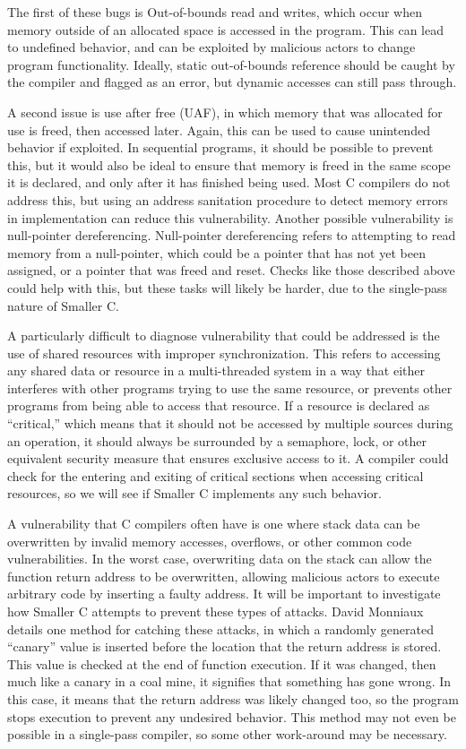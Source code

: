 \documentclass[sigconf, anonymous]{acmart}
\begin{document}
The first of these bugs is Out-of-bounds read and writes, which occur when memory outside of an allocated space is accessed in the program. This can lead to undefined behavior, and can be exploited by malicious actors to change program functionality. Ideally, static out-of-bounds reference should be caught by the compiler and flagged as an error, but dynamic accesses can still pass through.

A second issue is use after free (UAF), in which memory that was allocated for use is freed, then accessed later. Again, this can be used to cause unintended behavior if exploited. In sequential programs, it should be possible to prevent this, but it would also be ideal to ensure that memory is freed in the same scope it is declared, and only after it has finished being used. Most C compilers do not address this, but using an address sanitation procedure to detect memory errors in implementation can reduce this vulnerability. Another possible vulnerability is null-pointer dereferencing. Null-pointer dereferencing refers to attempting to read memory from a null-pointer, which could be a pointer that has not yet been assigned, or a pointer that was freed and reset. Checks like those described above could help with this, but these tasks will likely be harder, due to the single-pass nature of Smaller C. 

A particularly difficult to diagnose vulnerability that could be addressed is the use of shared resources with improper synchronization. This refers to accessing any shared data or resource in a multi-threaded system in a way that either interferes with other programs trying to use the same resource, or prevents other programs from being able to access that resource. If a resource is declared as “critical,” which means that it should not be accessed by multiple sources during an operation, it should always be surrounded by a semaphore, lock, or other equivalent security measure that ensures exclusive access to it. A compiler could check for the entering and exiting of critical sections when accessing critical resources, so we will see if Smaller C implements any such behavior. 

A vulnerability that C compilers often have is one where stack data can be overwritten by invalid memory accesses, overflows, or other common code vulnerabilities. In the worst case, overwriting data on the stack can allow the function return address to be overwritten, allowing malicious actors to execute arbitrary code by inserting a faulty address. It will be important to investigate how Smaller C attempts to prevent these types of attacks. David Monniaux details one method for catching these attacks, in which a randomly generated “canary” value is inserted before the location that the return address is stored.~\cite{Monniaux:Memory} This value is checked at the end of function execution. If it was changed, then much like a canary in a coal mine, it signifies that something has gone wrong. In this case, it means that the return address was likely changed too, so the program stops execution to prevent any undesired behavior. This method may not even be possible in a single-pass compiler, so some other work-around may be necessary.
\end{document}
